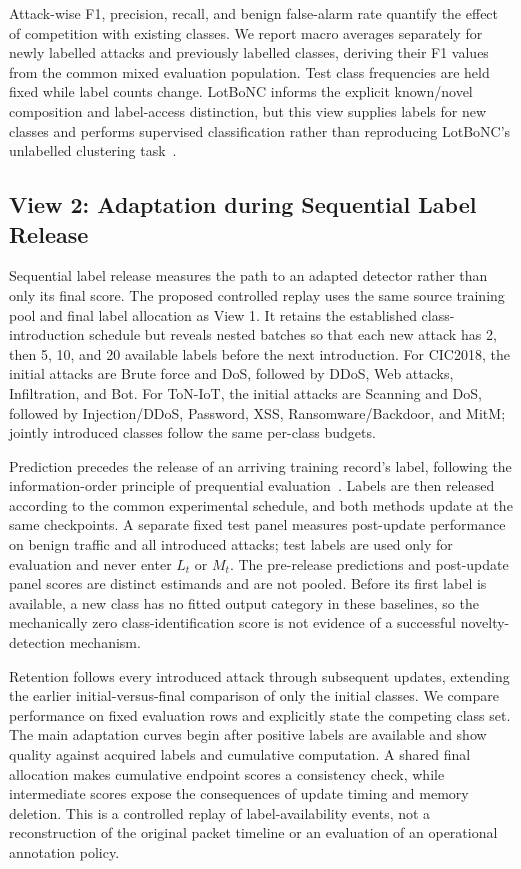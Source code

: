 \documentclass[sigconf,anonymous,pbalance]{acmart}
\begin{document}
Attack-wise F1, precision, recall, and benign false-alarm rate quantify the effect of competition with existing classes. We report macro averages separately for newly labelled attacks and previously labelled classes, deriving their F1 values from the common mixed evaluation population. Test class frequencies are held fixed while label counts change. LotBoNC informs the explicit known/novel composition and label-access distinction, but this view supplies labels for new classes and performs supervised classification rather than reproducing LotBoNC's unlabelled clustering task~\cite{hu2026lotbonc}.

\subsection{View 2: Adaptation during Sequential Label Release}
\label{sec:sequential-design}
Sequential label release measures the path to an adapted detector rather than only its final score. The proposed controlled replay uses the same source training pool and final label allocation as View 1. It retains the established class-introduction schedule but reveals nested batches so that each new attack has 2, then 5, 10, and 20 available labels before the next introduction. For CIC2018, the initial attacks are Brute force and DoS, followed by DDoS, Web attacks, Infiltration, and Bot. For ToN-IoT, the initial attacks are Scanning and DoS, followed by Injection/DDoS, Password, XSS, Ransomware/Backdoor, and MitM; jointly introduced classes follow the same per-class budgets.

Prediction precedes the release of an arriving training record's label, following the information-order principle of prequential evaluation~\cite{verma2026rethinking}. Labels are then released according to the common experimental schedule, and both methods update at the same checkpoints. A separate fixed test panel measures post-update performance on benign traffic and all introduced attacks; test labels are used only for evaluation and never enter $L_t$ or $M_t$. The pre-release predictions and post-update panel scores are distinct estimands and are not pooled. Before its first label is available, a new class has no fitted output category in these baselines, so the mechanically zero class-identification score is not evidence of a successful novelty-detection mechanism.

Retention follows every introduced attack through subsequent updates, extending the earlier initial-versus-final comparison of only the initial classes. We compare performance on fixed evaluation rows and explicitly state the competing class set. The main adaptation curves begin after positive labels are available and show quality against acquired labels and cumulative computation. A shared final allocation makes cumulative endpoint scores a consistency check, while intermediate scores expose the consequences of update timing and memory deletion. This is a controlled replay of label-availability events, not a reconstruction of the original packet timeline or an evaluation of an operational annotation policy.
\end{document}

